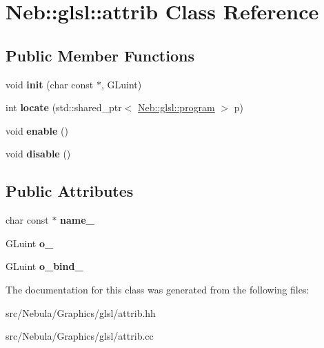 \hypertarget{classNeb_1_1glsl_1_1attrib}{\section{Neb\-:\-:glsl\-:\-:attrib Class Reference}
\label{classNeb_1_1glsl_1_1attrib}
}
\subsection*{Public Member Functions}
\begin{DoxyCompactItemize}
\item 
\hypertarget{classNeb_1_1glsl_1_1attrib_afb24889a6728269a254336c3f86cd5bc}{void {\bfseries init} (char const $\ast$, G\-Luint)}\label{classNeb_1_1glsl_1_1attrib_afb24889a6728269a254336c3f86cd5bc}

\item 
\hypertarget{classNeb_1_1glsl_1_1attrib_a83769556327a84a8bc29d1a65d452f12}{int {\bfseries locate} (std\-::shared\-\_\-ptr$<$ \hyperlink{classNeb_1_1glsl_1_1program}{Neb\-::glsl\-::program} $>$ p)}\label{classNeb_1_1glsl_1_1attrib_a83769556327a84a8bc29d1a65d452f12}

\item 
\hypertarget{classNeb_1_1glsl_1_1attrib_a2fad8a1a708d0eb8fdd5bf121623a3d2}{void {\bfseries enable} ()}\label{classNeb_1_1glsl_1_1attrib_a2fad8a1a708d0eb8fdd5bf121623a3d2}

\item 
\hypertarget{classNeb_1_1glsl_1_1attrib_a4625fa64ffbf21dd803410cf1e24c7ec}{void {\bfseries disable} ()}\label{classNeb_1_1glsl_1_1attrib_a4625fa64ffbf21dd803410cf1e24c7ec}

\end{DoxyCompactItemize}
\subsection*{Public Attributes}
\begin{DoxyCompactItemize}
\item 
\hypertarget{classNeb_1_1glsl_1_1attrib_ace010923299383f6c7f9023906597238}{char const $\ast$ {\bfseries name\-\_\-}}\label{classNeb_1_1glsl_1_1attrib_ace010923299383f6c7f9023906597238}

\item 
\hypertarget{classNeb_1_1glsl_1_1attrib_aa37e743b20a0e901d3274f4b88497195}{G\-Luint {\bfseries o\-\_\-}}\label{classNeb_1_1glsl_1_1attrib_aa37e743b20a0e901d3274f4b88497195}

\item 
\hypertarget{classNeb_1_1glsl_1_1attrib_acef1f0c5eb1de70001f4590e33eb9631}{G\-Luint {\bfseries o\-\_\-bind\-\_\-}}\label{classNeb_1_1glsl_1_1attrib_acef1f0c5eb1de70001f4590e33eb9631}

\end{DoxyCompactItemize}


The documentation for this class was generated from the following files\-:\begin{DoxyCompactItemize}
\item 
src/\-Nebula/\-Graphics/glsl/attrib.\-hh\item 
src/\-Nebula/\-Graphics/glsl/attrib.\-cc\end{DoxyCompactItemize}
